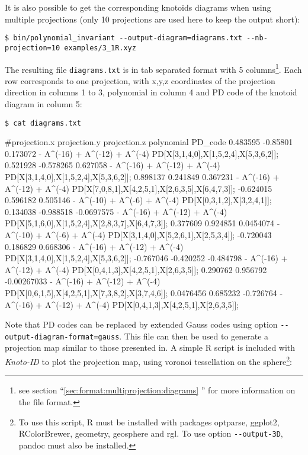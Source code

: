 It is also possible to get the corresponding knotoids diagrams when using multiple projections (only 10 projections are used here to keep the output short):
\begin{lstlisting}
$ bin/polynomial_invariant --output-diagram=diagrams.txt --nb-projection=10 examples/3_1R.xyz
\end{lstlisting}
The resulting file \lstinline{diagrams.txt} is in tab separated format with 5 columns\footnote{see section ``\ref{sec:format:multiprojection:diagrams} '' for more information on the file format.}. Each row corresponds to one projection, with x,y,z coordinates of the projection direction in columns 1 to 3, polynomial in column 4 and PD code of the knotoid diagram in column 5:
\begin{lstlisting}
$ cat diagrams.txt
\end{lstlisting}
\begin{lstlistingverysmall}
#projection.x  projection.y  projection.z  polynomial                    PD_code
0.483595       -0.85801      0.173072      - A^(-16) + A^(-12) + A^(-4)  PD[X[3,1,4,0],X[1,5,2,4],X[5,3,6,2]];
0.521928       -0.578265     0.627058      - A^(-16) + A^(-12) + A^(-4)  PD[X[3,1,4,0],X[1,5,2,4],X[5,3,6,2]];
0.898137       0.241849      0.367231      - A^(-16) + A^(-12) + A^(-4)  PD[X[7,0,8,1],X[4,2,5,1],X[2,6,3,5],X[6,4,7,3]];
-0.624015      0.596182      0.505146      - A^(-10) + A^(-6) + A^(-4)   PD[X[0,3,1,2],X[3,2,4,1]];
0.134038       -0.988518     -0.0697575    - A^(-16) + A^(-12) + A^(-4)  PD[X[5,1,6,0],X[1,5,2,4],X[2,8,3,7],X[6,4,7,3]];
0.377609       0.924851      0.0454074     - A^(-10) + A^(-6) + A^(-4)   PD[X[3,1,4,0],X[5,2,6,1],X[2,5,3,4]];
-0.720043      0.186829      0.668306      - A^(-16) + A^(-12) + A^(-4)  PD[X[3,1,4,0],X[1,5,2,4],X[5,3,6,2]];
-0.767046      -0.420252     -0.484798     - A^(-16) + A^(-12) + A^(-4)  PD[X[0,4,1,3],X[4,2,5,1],X[2,6,3,5]];
0.290762       0.956792      -0.00267033   - A^(-16) + A^(-12) + A^(-4)  PD[X[0,6,1,5],X[4,2,5,1],X[7,3,8,2],X[3,7,4,6]];
0.0476456      0.685232      -0.726764     - A^(-16) + A^(-12) + A^(-4)  PD[X[0,4,1,3],X[4,2,5,1],X[2,6,3,5]];
\end{lstlistingverysmall}
Note that PD codes can be replaced by extended Gauss codes using option \lstinline{--output-diagram-format=gauss}.
This file can then be used to generate a projection map similar to those presented in\cite{gound,gound2}.
A simple {\ttfamily R} script\cite{r2017} is included with {\it Knoto-ID} to plot the projection map, using voronoi tessellation on the sphere\footnote{To use this script, {\ttfamily R}\cite{r2017} must be installed with packages {\ttfamily optparse}\cite{optparse}, {\ttfamily ggplot2}\cite{wickham2009}, {\ttfamily RColorBrewer}\cite{rcolorbrewer}, {\ttfamily geometry}\cite{geometry}, {\ttfamily geosphere}\cite{geosphere} and {\ttfamily rgl}\cite{rgl}. To use option \lstinline{--output-3D}, pandoc\cite{pandoc} must also be installed.}:
